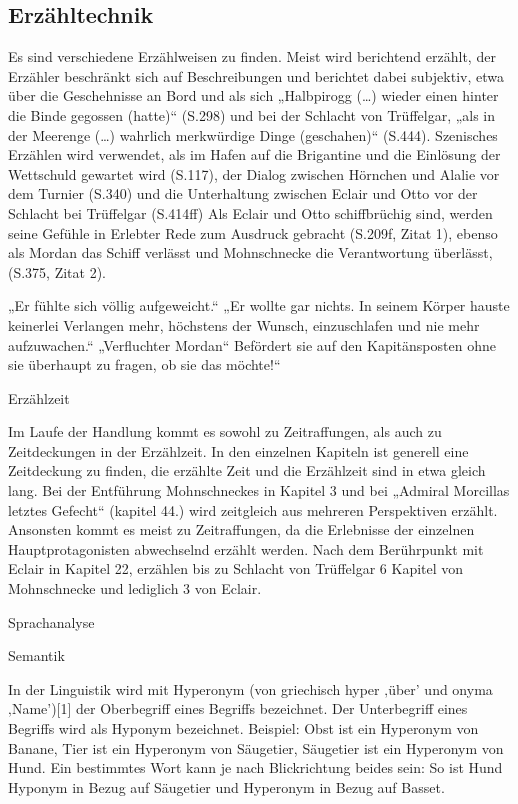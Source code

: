 {\subsection{Erzähltechnik}

Es sind verschiedene Erzählweisen zu finden. Meist wird berichtend erzählt, der Erzähler beschränkt sich auf Beschreibungen und berichtet dabei  subjektiv, etwa über die Geschehnisse an Bord und als sich „Halbpirogg (…) wieder einen hinter die Binde gegossen (hatte)“ (S.298) und bei der Schlacht von Trüffelgar, „als in der Meerenge (…) wahrlich merkwürdige Dinge (geschahen)“ (S.444). Szenisches Erzählen wird verwendet, als im Hafen auf die Brigantine und die Einlösung der Wettschuld gewartet wird (S.117), der Dialog zwischen Hörnchen und Alalie vor dem Turnier (S.340) und die Unterhaltung zwischen Eclair und Otto vor der Schlacht bei Trüffelgar (S.414ff) Als Eclair und Otto schiffbrüchig sind, werden seine Gefühle in Erlebter Rede zum Ausdruck gebracht (S.209f, Zitat 1), ebenso als Mordan das Schiff verlässt und Mohnschnecke die Verantwortung überlässt,(S.375, Zitat 2).


„Er fühlte sich völlig aufgeweicht.“ „Er wollte gar nichts. In seinem Körper hauste keinerlei Verlangen mehr, höchstens der Wunsch, einzuschlafen und nie mehr aufzuwachen.“
„Verfluchter Mordan“ Befördert sie auf den Kapitänsposten ohne sie überhaupt zu fragen, ob sie das möchte!“

Erzählzeit

Im Laufe der Handlung kommt es sowohl zu Zeitraffungen, als auch zu Zeitdeckungen in der Erzählzeit. In den einzelnen Kapiteln ist generell eine Zeitdeckung zu finden, die erzählte Zeit und die Erzählzeit sind in etwa gleich lang. Bei der Entführung Mohnschneckes in Kapitel 3 und bei „Admiral Morcillas letztes Gefecht“ (kapitel 44.) wird zeitgleich aus mehreren Perspektiven erzählt. Ansonsten kommt es meist zu Zeitraffungen, da die Erlebnisse der einzelnen Hauptprotagonisten abwechselnd erzählt werden.  Nach dem Berührpunkt mit Eclair in Kapitel 22, erzählen bis zu Schlacht von Trüffelgar 6 Kapitel von Mohnschnecke und lediglich 3 von Eclair.

Sprachanalyse
 
Semantik


In der Linguistik wird mit Hyperonym (von griechisch hyper ‚über’ und onyma ‚Name’)[1] der Oberbegriff eines Begriffs bezeichnet. Der Unterbegriff eines Begriffs wird als Hyponym bezeichnet.
Beispiel: Obst ist ein Hyperonym von Banane, Tier ist ein Hyperonym von Säugetier, Säugetier ist ein Hyperonym von Hund.
Ein bestimmtes Wort kann je nach Blickrichtung beides sein: So ist Hund Hyponym in Bezug auf Säugetier und Hyperonym in Bezug auf Basset.


}

